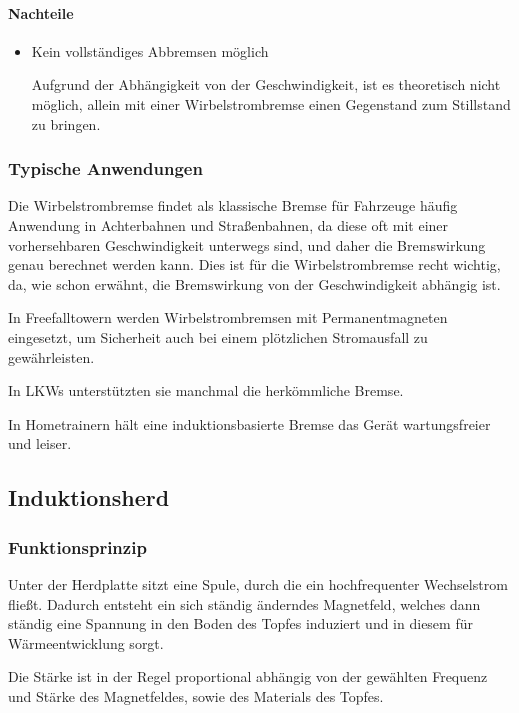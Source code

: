 \paragraph{Nachteile}

\begin{itemize}

	\item Kein vollständiges Abbremsen möglich
	
Aufgrund der Abhängigkeit von der Geschwindigkeit, ist es theoretisch nicht möglich, allein mit einer Wirbelstrombremse einen Gegenstand zum Stillstand zu bringen.

\end{itemize}


\subsubsection{Typische Anwendungen}

Die Wirbelstrombremse findet als klassische Bremse für Fahrzeuge häufig Anwendung in Achterbahnen und Straßenbahnen, da diese oft mit einer vorhersehbaren Geschwindigkeit unterwegs sind, und daher die Bremswirkung genau berechnet werden kann. Dies ist für die Wirbelstrombremse recht wichtig, da, wie schon erwähnt, die Bremswirkung von der Geschwindigkeit abhängig ist.

In Freefalltowern werden Wirbelstrombremsen mit Permanentmagneten eingesetzt, um Sicherheit auch bei einem plötzlichen Stromausfall zu gewährleisten.

In LKWs unterstützten sie manchmal die herkömmliche Bremse.

In Hometrainern hält eine induktionsbasierte Bremse das Gerät wartungsfreier und leiser.


\subsection{Induktionsherd}

\subsubsection{Funktionsprinzip}

Unter der Herdplatte sitzt eine Spule, durch die ein hochfrequenter Wechselstrom fließt. Dadurch entsteht ein sich ständig änderndes Magnetfeld, welches dann ständig eine Spannung in den Boden des Topfes induziert und in diesem für Wärmeentwicklung sorgt.

Die Stärke ist in der Regel proportional abhängig von der gewählten Frequenz und Stärke des Magnetfeldes, sowie des Materials des Topfes.


